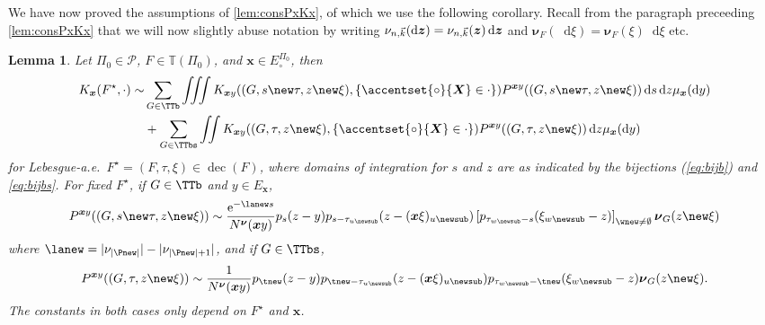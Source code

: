 \documentclass[reqno,draft]{amsart}
\numberwithin{equation}{section}
\theoremstyle{plain}
\newtheorem{lemma}[theorem]{Lemma}
\theoremstyle{remark}
\newcommand*\diff{\mathop{}\!\mathrm{d}}
\newcommand{\e}{\mathrm{e}}
\newcommand{\fpart}{\Pi} %
\DeclareMathOperator{\dcb}{dec}
\newcommand{\nut}[1]{|\nu_{#1}|}
\newcommand{\nunk}{\nu_{n,\smash{\vec{k}}}}
\newcommand{\gnk}{\nu_{n,\smash{\vec{k}}}}
\newcommand{\rs}[1]{\accentset{\circ}{#1}} %
\begin{document}
We have now proved the assumptions of \cref{lem:consPxKx}, of which we use the following corollary.
Recall from the paragraph preceeding \cref{lem:consPxKx} that we will now slightly abuse notation by writing $\nunk(\diff \boldsymbol z) = \gnk(\boldsymbol z)\diff \boldsymbol z$ and $\boldsymbol \nu_F(\diff \xi) = \boldsymbol \nu_F(\xi)\diff \xi$ etc.

\begin{lemma}\label{lem:samplingconKx}
    Let $\fpart_0\in \mathcal{P}$, $F\in \mathbb{T}(\fpart_0)$, and $\boldsymbol x\in E^{\fpart_0}_\circ $, then
    \begin{align}
        K_{\boldsymbol x}(F^\star,\cdot ) \sim &\sum_{G\in \TTb} \iiint K_{\boldsymbol x y}((G,s\new\tau,z\new\xi),\{\rs{\boldsymbol X}\in\cdot\} ) P^{\boldsymbol xy}((G,s\new\tau,z\new\xi)) \diff s\diff z\mu_{\boldsymbol x}(\diff y)\nonumber\\
                                               &+ \sum_{G\in \TTbs} \iint K_{\boldsymbol x y}((G,\tau,z\new\xi),\{\rs{\boldsymbol X}\in\cdot\} ) P^{\boldsymbol xy}((G,\tau,z\new\xi)) \diff z\mu_{\boldsymbol x}(\diff y)\label{eq:samplingconKx}
    \end{align}
    for Lebesgue-a.e.\ $F^\star = (F,\tau,\xi) \in \dcb(F)$, where domains of integration for $s$ and $z$ are as indicated by the bijections \textup{(\ref{eq:bijb})} and \cref{eq:bijbs}. For fixed $F^\star$, if $G \in \TTb$ and $y\in E_{\boldsymbol x}$,
    \begin{equation}\label{eq:Pxyb}
        P^{\boldsymbol x y}((G,s\new\tau,z\new\xi)) \sim \frac{\e^{-\lanew s}}{N^{\boldsymbol\nu}(\boldsymbol xy)} p_s(z-y) p_{s-\tau_{u\newsub}}(z-(\boldsymbol x\xi)_{u\newsub}) \left[ p_{\tau_{w\newsub} -s}(\xi_{w\newsub}-z) \right] _{\wnew\neq \emptyset} \boldsymbol \nu_G(z\new\xi)
    \end{equation}
    where $\lanew = \nut{|\Pnew|} - \nut{|\Pnew|+1}$, and if $G\in \TTbs$,
    \begin{equation}\label{eq:Pxybs}
        P^{\boldsymbol x y}((G,\tau,z\new\xi)) \sim \frac{1}{N^{\boldsymbol\nu}(\boldsymbol xy)}p_{\tnew}(z-y) p_{\tnew-\tau_{u\newsub}}(z-(\boldsymbol x\xi)_{u\newsub}) p_{\tau_{w\newsub}-\tnew}(\xi_{w\newsub}-z) \boldsymbol \nu_G(z\new\xi).
    \end{equation}
    The constants in both cases only depend on $F^\star$ and $\boldsymbol x$.
\end{lemma}
\end{document}
